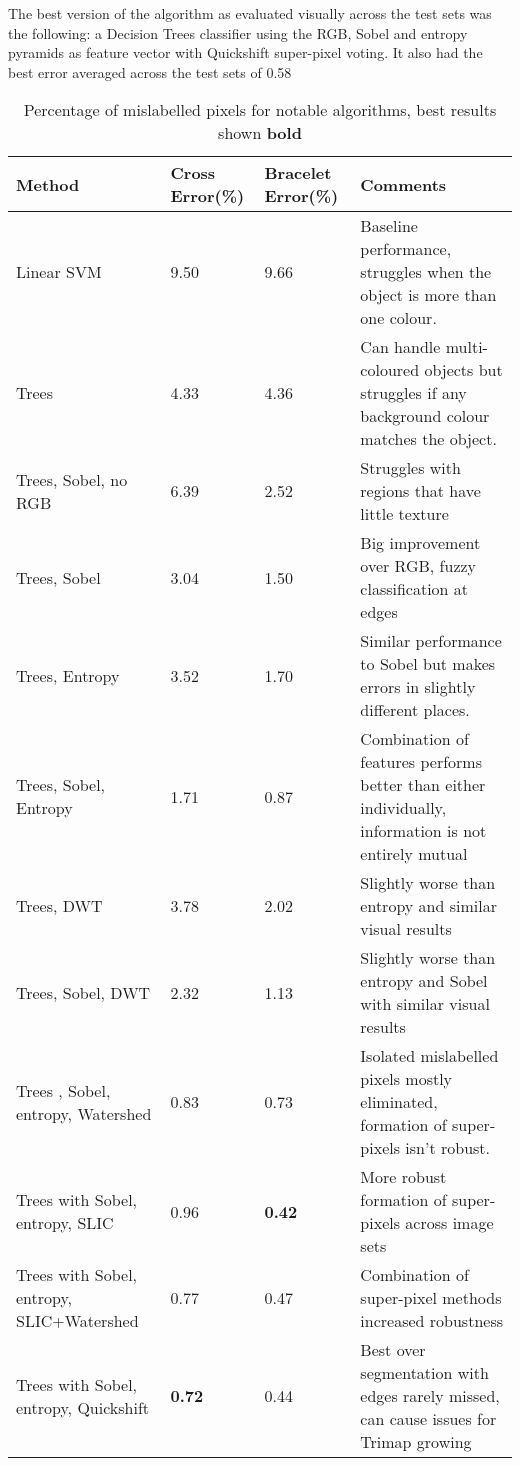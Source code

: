 \documentclass[12pt]{IIBproject}
\begin{document}
The best version of the algorithm as evaluated visually across the test sets was the following: a Decision Trees classifier using the RGB, Sobel and entropy pyramids as feature vector with Quickshift super-pixel voting. It also had the best error averaged across the test sets of 0.58%
\begin{table}[H]
\begin{center}
    \begin{tabular}{ | p{3cm} | l | l | p{5cm} |}
    
    \hline
    \textbf{Method} & \textbf{Cross Error(\%)} & \textbf{Bracelet Error(\%)} & \textbf{Comments} \\ \hline
    Linear SVM & 9.50 & 9.66 & Baseline performance, struggles when the object is more than one colour.\\ \hline
    Trees & 4.33 & 4.36 & Can handle multi-coloured objects but struggles if any background colour matches the object.\\ \hline
    Trees, Sobel, no RGB & 6.39 & 2.52 & Struggles with regions that have little texture \\ \hline
    Trees, Sobel & 3.04 & 1.50 & Big improvement over RGB, fuzzy classification at edges \\ \hline
    Trees, Entropy & 3.52 & 1.70 & Similar performance to Sobel but makes errors in slightly different places.\\ \hline
    Trees, Sobel, Entropy & 1.71 & 0.87 & Combination of features performs better than either individually, information is not entirely mutual\\
    \hline
    Trees, DWT  & 3.78 & 2.02 & Slightly worse than entropy and similar visual results \\
    \hline
    Trees, Sobel, DWT & 2.32 & 1.13 & Slightly worse than entropy and Sobel with similar visual results\\
    \hline
    Trees , Sobel, entropy, Watershed & 0.83 & 0.73 & Isolated mislabelled pixels mostly eliminated, formation of super-pixels isn't robust. \\
    \hline
    Trees with Sobel, entropy, SLIC & 0.96 & \textbf{0.42} & More robust formation of super-pixels across image sets \\
    \hline
    Trees with Sobel, entropy, SLIC+Watershed & 0.77 & 0.47 & Combination of super-pixel methods increased robustness \\
    \hline
     Trees with Sobel, entropy, Quickshift & \textbf{0.72} & 0.44 & Best over segmentation with edges rarely missed, can cause issues for Trimap growing\\
    \hline
     
    \end{tabular}
    \caption{Percentage of mislabelled pixels for notable algorithms, best results shown \textbf{bold}}\label{table:somename}
\end{center}
\end{table}
 
\end{document}
